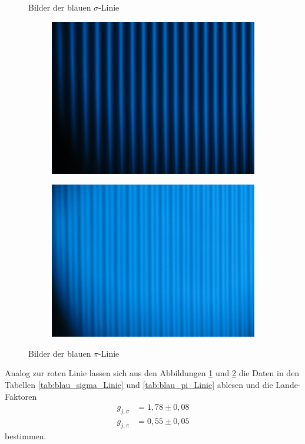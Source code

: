 \begin{figure}
\begin{subfigure}{0.4\textwidth}
  \end{subfigure}
  \caption{Bilder der blauen $\sigma$-Linie}
  \label{fig:blau_sigma_Linie}
\end{figure}

\begin{figure}
  \centering
  \begin{subfigure}{0.4\textwidth}
    \centering
    \includegraphics[width=\textwidth]{Bilder/blau_pi_ohne_B.JPG}
  \end{subfigure}
  \begin{subfigure}{0.4\textwidth}
    \centering
    \includegraphics[width=\textwidth]{Bilder/blau_pi_mit_B.JPG}
  \end{subfigure}
  \caption{Bilder der blauen $\pi$-Linie}
  \label{fig:blau_pi_Linie}
\end{figure}
Analog zur roten Linie lassen sich aus den Abbildungen \ref{fig:blau_sigma_Linie} und \ref{fig:blau_pi_Linie} die Daten in den Tabellen \ref{tab:blau_sigma_Linie} und \ref{tab:blau_pi_Linie} ablesen
und die Lande-Faktoren
\begin{align}
  g_{j, \sigma} &= 1,78\pm 0,08\nonumber\\
  g_{j, \pi}    &= 0,55\pm 0,05
\end{align}
bestimmen.